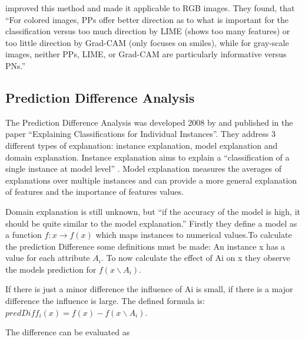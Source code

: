  improved this method and made it applicable to RGB images.
They found, that “For colored images, PPs offer better direction as to what is important for the classification versus too much direction by LIME (shows too many features) or too little direction by Grad-CAM (only focuses on smiles), while for gray-scale images, neither PPs, LIME, or Grad-CAM are particularly informative versus PNs.” 

\subsection{Prediction Difference Analysis}
The Prediction Difference Analysis was developed 2008 by  and published in the paper “Explaining Classifications for Individual Instances”. They address 3 different types of explanation: instance explanation, model explanation and domain explanation. Instance explanation aims to explain a “classification of a single instance at model level” \cite[2]{RobnikSikonja.2008}. Model explanation measures the averages of explanations over multiple instances and can provide a more general explanation of features and the importance of features values.
\par
Domain explanation is still unknown, but “if the accuracy of the model is high, it should be quite similar to the model explanation.” \cite[2]{RobnikSikonja.2008} Firstly they define a model as a function \(f : x → f(x)\) which maps instances to numerical values.To calculate the prediction Difference some definitions must be made: An instance x has a value for each attribute \(A_{i}\). To now calculate the effect of Ai on x they observe the models prediction for  \(f(x \backslash A_{i})\). 
\par
If there is just a minor difference the influence of Ai is small, if there is a major difference the influence is large. The defined formula is: 
\(predDiff_{i} (x) = f(x)− f(x \backslash A_{i})\).
\par
The difference can be evaluated as 
